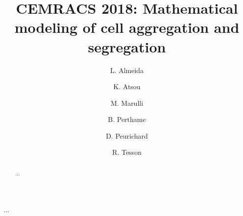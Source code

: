 \documentclass[proc]{edpsmath}
\theoremstyle{definition}
\theoremstyle{remark}
\begin{document}

\title{CEMRACS 2018: Mathematical modeling of cell aggregation and segregation}
\author{L. Almeida}\address{}
\author{K. Atsou}\address{Laboratoire J.A. Dieudonn\'e, Universit\'e de Nice Sophia-Antipolis,}
\author{M. Marulli}\address{LAGA, Universit\'e Paris 13, Universit\`a di Bologna,}
\author{B. Perthame}\address{}
\author{D. Peurichard}\address{}
\author{R. Tesson}\address{Institut Math\'ematiques de Marseille, Aix-Marseille Universit\'e}

\begin{abstract} ... \end{abstract}
%
\begin{resume} ... \end{resume}

\maketitle 











 
\end{document}
